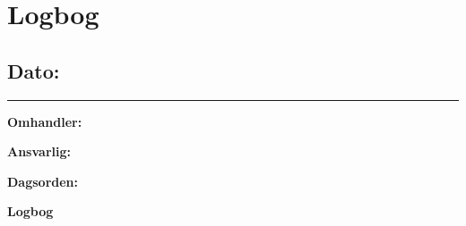 \chapter{Logbog}

\section{Dato:  }
\hrule

\textbf{Omhandler:} 

\textbf{Ansvarlig:} 

\textbf{Dagsorden:}

\textbf{Logbog}
\\
\\




	

